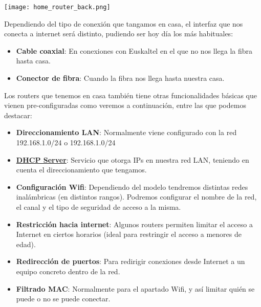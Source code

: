 \begin{center}
    \vspace{-15pt}
    \texttt{[image: home\_router\_back.png]}
    \vspace{-4pt}
    \vspace{-15pt}
\end{center}


Dependiendo del tipo de conexión que tangamos en casa, el interfaz que nos conecta a internet será distinto, pudiendo ser hoy día los más habituales:

\begin{itemize}
    \item \textbf{Cable coaxial}: En conexiones con Euskaltel en el que no nos llega la fibra hasta casa.
    \item \textbf{Conector de fibra}: Cuando la fibra nos llega hasta nuestra casa.
\end{itemize}

Los routers que tenemos en casa también tiene otras funcionalidades básicas que vienen pre-configuradas como veremos a continuación, entre las que podemos destacar:

\begin{itemize}
    \item \textbf{Direccionamiento LAN}: Normalmente viene configurado con la red 192.168.1.0/24 o 192.168.1.0/24

    \item \textbf{\hyperlink{dhcp}{DHCP Server}}: Servicio que otorga IPs en nuestra red LAN, teniendo en cuenta el direccionamiento que tengamos.

    \item \textbf{Configuración Wifi}: Dependiendo del modelo tendremos distintas redes inalámbricas (en distintos rangos). Podremos configurar el nombre de la red, el canal y el tipo de seguridad de acceso a la misma.

    \item \textbf{Restricción hacia internet}: Algunos routers permiten limitar el acceso a Internet en ciertos horarios (ideal para restringir el acceso a menores de edad).

    \item \textbf{Redirección de puertos}: Para redirigir conexiones desde Internet a un equipo concreto dentro de la red.

    \item \textbf{Filtrado MAC}: Normalmente para el apartado Wifi, y así limitar quién se puede o no se puede conectar.
\end{itemize}


